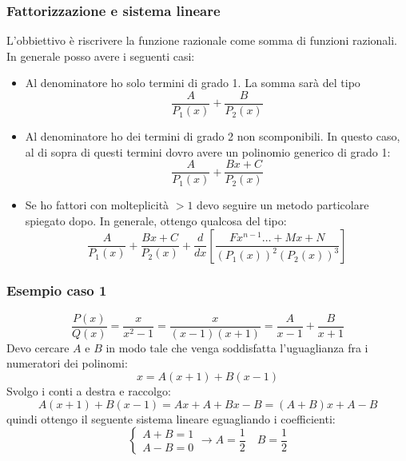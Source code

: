 \subsubsection*{Fattorizzazione e sistema lineare}
L'obbiettivo è riscrivere la funzione razionale come somma di funzioni razionali. In generale posso avere i seguenti casi:
\begin{itemize}
	\item Al denominatore ho solo termini di grado 1. La somma sarà del tipo
	      \[
		      \frac{A}{P_1\left( x \right) }+ \frac{B}{P_2\left( x \right) }
	      \]
	\item Al denominatore ho dei termini di grado 2 non scomponibili. In questo caso, al di sopra di questi termini dovro avere un polinomio generico di grado 1:
	      \[
		      \frac{A}{P_1\left( x \right) }  + \frac{Bx + C}{P_2\left( x \right) }
	      \]
	\item Se ho fattori con molteplicità $ >1 $ devo seguire un metodo particolare spiegato dopo. In generale, ottengo qualcosa del tipo:
	      \[
		      \frac{A}{P_1\left( x \right) }+ \frac{Bx + C}{P_2\left( x \right) } + \frac{d}{dx}\left[ \frac{Fx^{n-1}\ldots  + Mx + N}{\left( P_1\left( x \right)  \right) ^{2}\left( P_2\left( x \right)  \right) ^{3}} \right]
	      \]
\end{itemize}
\hr
\subsubsection*{Esempio caso 1}
\[
	\frac{P\left( x \right) }{Q\left( x \right) }= \frac{x}{x^2-1}= \frac{x}{\left( x-1 \right) \left( x+1 \right) }= \frac{A}{x-1}+ \frac{B}{x+1}
\]
Devo cercare $ A $ e $ B $ in modo tale che venga soddisfatta l'uguaglianza fra i numeratori dei polinomi:
\[
	x=A\left( x+1 \right) +B\left( x-1 \right)
\]
Svolgo i conti a destra e raccolgo:
\[
	A\left( x+1 \right) +B\left( x-1 \right)= Ax + A + Bx - B = \left( A+B \right) x + A - B
\]
quindi ottengo il seguente sistema lineare eguagliando i coefficienti:
\[
	\begin{cases}
		A+B = 1 \\
		A-B = 0
	\end{cases}
	\rightarrow A = \frac{1}{2} \quad B = \frac{1}{2}
\]
\hr
